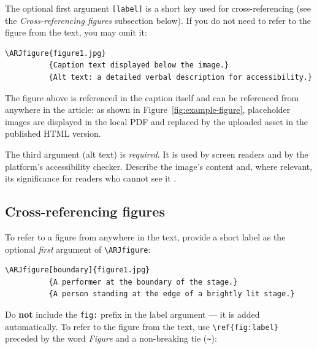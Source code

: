 The optional first argument \texttt{[label]} is a short key used for
cross-referencing (see the \emph{Cross-referencing figures} subsection
below). If you do not need to refer to the figure from the text, you
may omit it:

\begin{verbatim}
\ARJfigure{figure1.jpg}
          {Caption text displayed below the image.}
          {Alt text: a detailed verbal description for accessibility.}
\end{verbatim}


The figure above is referenced in the caption itself and can be
referenced from anywhere in the article: as shown in
Figure~\ref{fig:example-figure}, placeholder images are displayed in
the local PDF and replaced by the uploaded asset in the published
HTML version.

The third argument (alt text) is \emph{required}. It is used by screen
readers and by the platform's accessibility checker. Describe the
image's content and, where relevant, its significance for readers who
cannot see it \citep{sar2021guidelines}.

\subsection{Cross-referencing figures}

To refer to a figure from anywhere in the text, provide a short label
as the optional \emph{first} argument of \verb|\ARJfigure|:

\begin{verbatim}
\ARJfigure[boundary]{figure1.jpg}
          {A performer at the boundary of the stage.}
          {A person standing at the edge of a brightly lit stage.}
\end{verbatim}

Do \textbf{not} include the \texttt{fig:} prefix in the label argument
--- it is added automatically. To refer to the figure from the text,
use \verb|\ref{fig:label}| preceded by the word \emph{Figure} and a
non-breaking tie (\verb|~|):

